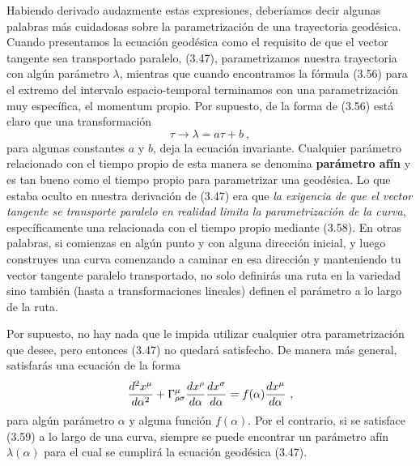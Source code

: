 \documentclass[11pt,b5paper,openany,twoside]{book}
\begin{document}
Habiendo derivado audazmente estas expresiones, deberíamos decir algunas palabras más cuidadosas sobre la parametrización de una trayectoria geodésica.
Cuando presentamos la ecuación geodésica como el requisito de que el vector tangente sea transportado paralelo, (3.47), parametrizamos nuestra trayectoria con algún parámetro $\lambda$, mientras que cuando encontramos la fórmula (3.56) para el extremo del intervalo espacio-temporal terminamos con una parametrización muy específica, el momentum propio.
Por supuesto, de la forma de (3.56) está claro que una transformación
\begin{equation}
\tau \rightarrow \lambda = a\tau +b \ ,\label{3.58}
\end{equation}
para algunas constantes $a$ y $b$, deja la ecuación invariante.
Cualquier parámetro relacionado con el tiempo propio de esta manera se denomina {\bf parámetro afín} y es tan bueno como el tiempo propio para parametrizar una geodésica.
Lo que estaba oculto en nuestra derivación de (3.47) era que \textit{la exigencia de que el vector tangente se transporte paralelo en realidad limita la parametrización de la curva}, específicamente una relacionada con el tiempo propio mediante (3.58).
En otras palabras, si comienzas en algún punto y con alguna dirección inicial, y luego construyes una curva comenzando a caminar en esa dirección y manteniendo tu vector tangente paralelo transportado, no solo definirás una ruta en la variedad sino también (hasta a transformaciones lineales) definen el parámetro a lo largo de la ruta.

Por supuesto, no hay nada que le impida utilizar cualquier otra parametrización que desee, pero entonces (3.47) no quedará satisfecho.
De manera más general, satisfarás una ecuación de la forma
\begin{equation}
{{d^2x^\mu}\over{d\alpha^2}}+\Gamma^\mu_{\rho\sigma}
{{dx^\rho}\over{d\alpha}}{{dx^\sigma}\over{d\alpha}}=
f(\alpha){{dx^\mu}\over{d\alpha}}\ ,\label{3.59}
\end{equation}
para algún parámetro $\alpha$ y alguna función $f(\alpha)$.
Por el contrario, si se satisface (3.59) a lo largo de una curva, siempre se puede encontrar un parámetro afín $\lambda(\alpha)$ para el cual se cumplirá la ecuación geodésica (3.47).
\end{document}
